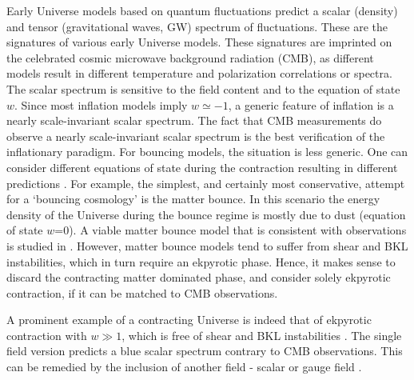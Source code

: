 \documentclass[12pt,a4paper]{article}
\numberwithin{equation}{section}
\numberwithin{equation}{section}
\begin{document}
Early Universe models based on quantum fluctuations predict a scalar (density) and tensor (gravitational waves, GW) spectrum of fluctuations. These are the signatures of various early Universe models. These signatures are imprinted on the celebrated cosmic microwave background radiation (CMB), as different models result in different temperature and polarization correlations or spectra.
The scalar spectrum is sensitive to the field content and to the equation of state $w$. Since most inflation models imply $w\simeq-1$, a generic feature of inflation is a nearly scale-invariant scalar spectrum. 
The fact that CMB measurements do observe a nearly scale-invariant scalar spectrum is the best verification of the inflationary paradigm. 
For bouncing models, the situation is less generic. One can consider different equations of state during the contraction resulting in different predictions \cite{Lehners:2010fy,BATTEFELD20151}. For example, the simplest, and certainly most conservative, attempt for a `bouncing cosmology' is the matter bounce. In this scenario the energy density of the Universe during the bounce regime is mostly due to dust (equation of state $w$=0). A viable matter bounce model that is consistent with observations is studied in \cite{Raveendran:2017vfx, Raveendran:2018why}. However, matter bounce models tend to suffer from shear and BKL instabilities, which in turn require an ekpyrotic phase. Hence, it makes sense to discard the contracting matter dominated phase, and consider solely ekpyrotic contraction, if it can be matched to CMB observations.

A prominent example of a contracting Universe is indeed that of ekpyrotic contraction with $w\gg1$, which is free of shear and BKL instabilities  \cite{BATTEFELD20151,Khoury:2001wf}. The single field version predicts a blue scalar spectrum contrary to CMB observations. This can be remedied by the inclusion of another field - scalar or gauge field \cite{BATTEFELD20151,r3,r1,Artymowski:2020pci,r4}. 
\end{document}
